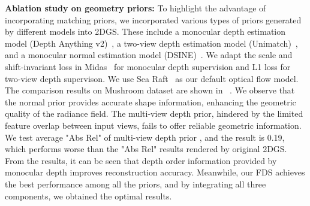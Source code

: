 \textbf{Ablation study on geometry priors:} 
To highlight the advantage of incorporating matching priors, 
we incorporated various types of priors generated by different 
models into 2DGS. These include a monocular depth estimation
model (Depth Anything v2)~\citep{yang2024depth}, a two-view depth estimation 
model (Unimatch)~\citep{xu2023unifying}, 
and a monocular normal estimation model (DSINE)~\citep{bae2024rethinking}.
We adapt the scale and shift-invariant loss in Midas~\citep{birkl2023midas} for
monocular depth supervision and L1 loss for two-view depth supervison.
%
We use Sea Raft~\citep{wang2025sea} as our default optical flow model.
%
The comparison results on Mushroom dataset 
are shown in ~.
We observe that the normal prior provides accurate shape information, 
enhancing the geometric quality of the radiance field. 
%
%
The multi-view depth prior, hindered by the limited feature overlap 
between input views, fails to offer reliable geometric 
information. We test average "Abs Rel" of multi-view depth prior
, and the result is 0.19, which performs worse than the "Abs Rel" results 
rendered by original 2DGS.
From the results, it can be seen that depth order information provided by monocular depth improves
reconstruction accuracy. Meanwhile, our FDS achieves the best performance among all the priors, 
and by integrating all
three components, we obtained the optimal results.
%
%

